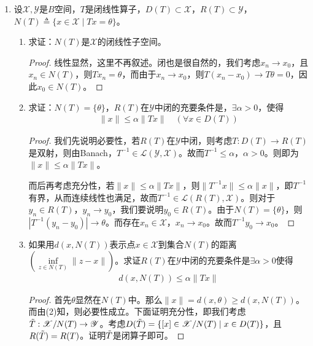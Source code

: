 \begin{enumerate}[leftmargin=2cm, label=\arabic*]
    \item 设$\mathscr{X},\mathscr{Y}$是$B$空间，$T$是闭线性算子，$D(T)\subset \mathscr{X}$，$R(T)\subset\mathscr{Y}$，$N(T)\triangleq\{x\in\mathscr{X}\mid Tx = \theta\}$。
    \begin{enumerate}[leftmargin=1cm, label=(\arabic*)]
        \item 求证：$N(T)$是$\mathscr{X}$的闭线性子空间。
        \begin{proof}
            线性显然，这里不再叙述。闭也是很自然的，我们考虑$x_n\to x_0$，且$x_n\in N(T)$，则$Tx_n = \theta$，而由于$x_n \to x_0$，则$T(x_n-x_0) \to T\theta = 0$，因此$x_0\in N(T)$。
        \end{proof}

        \item 求证：$N(T) = \{\theta\}$，$R(T)$在$\mathscr{Y}$中闭的充要条件是，$\exists \alpha>0$，使得
        \begin{align*}
            \|x\| \leqslant \alpha\|Tx\| \quad (\forall x\in D(T))
        \end{align*}
        \begin{proof}
            我们先说明必要性，若$R(T)$在$\mathscr{Y}$中闭，则考虑$T:D(T)\to R(T)$是双射，则由Banach，$T^{-1}\in\mathscr{L}(\mathscr{Y},\mathscr{X})$。故而$T^{-1}\leqslant \alpha$，$\alpha>0$。则即为$\|x\| \leqslant \alpha \|Tx\|$。

            而后再考虑充分性，若$\|x\| \leqslant \alpha \|Tx\|$，则$\|T^{-1}x\|\leqslant \alpha \|x\|$，即$T^{-1}$有界，从而连续线性也满足，故而$T^{-1}\in\mathscr{L}(R(T),\mathscr{X})$。则对于$y_n\in R(T)$，$y_n\to y_0$，我们要说明$y_0 \in R(T)$。由于$N(T) = \{\theta\}$，则$|T^{-1}(y_n - y_0)| \to \theta$。而存在$x_n \in\mathscr{X}$，$x_n \to x_0$。故而$T^{-1} y_0 \to x_0$。
        \end{proof}

        \item 如果用$d(x,N(T))$表示点$x\in\mathscr{X}$到集合$N(T)$的距离$\left(\inf\limits_{z \in N(T)} \|z - x\|\right)$。求证$R(T)$在$\mathscr{Y}$中闭的充要条件是$\exists \alpha>0$使得
        \begin{align*}
            d(x, N(T)) \leqslant \alpha\|Tx\|
       \end{align*}
        \begin{proof}
            首先$\theta$显然在$N(T)$中。那么$\|x\| = d(x,\theta) \geqslant d(x,N(T))$。而由(2)知，则必要性成立。下面证明充分性，即我们考虑$\Tilde{T}: \mathscr{X}/N(T)\to\mathscr{Y}$。考虑$D(\Tilde{T}) = \{[x]\in \mathscr{X}/N(T)\mid x\in D(T)\}$，且$R(\Tilde{T}) = R(T)$。证明$\Tilde{T}$是闭算子即可。
        \end{proof}
    \end{enumerate}


\end{enumerate}
